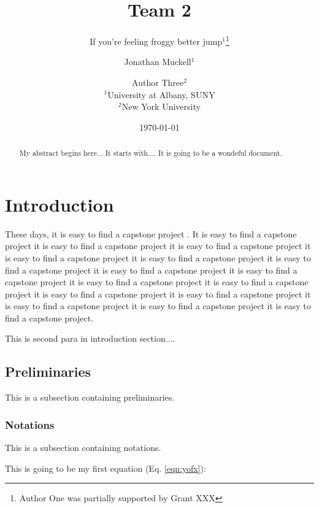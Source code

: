 \documentclass[11pt]{article}
\date{
\today
}
\theoremstyle{plain}
\theoremstyle{definition}
\begin{document}
\title{Team 2}
\author{If you're feeling froggy better jump$^1$\thanks{Author One was partially supported by Grant XXX} \and Jonathan Muckell$^1$ \and Author Three$^2$\\
$^1$University at Albany, SUNY\\
$^2$New York University}
	\maketitle
	
\begin{abstract}
My abstract begins here... It starts with.... It is going to be a wondeful document.
		
\end{abstract}


\section{Introduction}
\label{sec:intro}
These days, it is easy to find a capstone project \cite{Atrey2021BrickHouseSecuity}. It is easy to find a capstone project it is easy to find a capstone project it is easy to find a capstone project it is easy to find a capstone project it is easy to find a capstone project it is easy to find a capstone project it is easy to find a capstone project it is easy to find a capstone project it is easy to find a capstone project it is easy to find a capstone project it is easy to find a capstone project it is easy to find a capstone project it is easy to find a capstone project it is easy to find a capstone project it is easy to find a capstone project.

This is second para in introduction section....

\subsection{Preliminaries}\label{sec:prelim}
This is a subsection containing preliminaries.

\subsubsection{Notations}\label{sec:notations}
This is a subsection containing notations.

This is going to be my first equation (Eq. \ref{eqn:yofx}):
	
\end{document}
